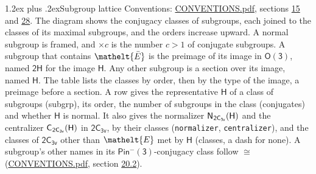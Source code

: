 \documentclass[10pt,a4paper]{article}
\makeatletter
\renewcommand\section{\@startsection{section}{1}{\z@}{-3ex plus -1ex minus -.2ex}%
  {1.2ex plus .2ex}{\normalfont\large\sffamily\bfseries\color{parttitle}}}
\numberwithin{equation}{section}
\newcommand{\eltfont}[1]{{\let\sigma\eltsigma\mathelt{#1}}}
\newcommand{\grp}[1]{\mathsf{#1}}
\newcommand{\cls}[1]{\eltfont{#1}}
\newcommand{\elt}[1]{\eltfont{#1}}
\newcommand{\samecls}{\cong}
\newcommand{\nconj}[1]{{\scriptsize$\times#1$}}
\newcommand{\barred}[1]{\bar{#1}}
\newcommand{\hairsp}{\mkern1mu}
\makeatother
\begin{document}
\section{Subgroup lattice}\label{s:subgroups}
Conventions: \href{../../CONVENTIONS.pdf}{CONVENTIONS.pdf}, sections \href{../../../rotation/CONVENTIONS.pdf\#conv.15}{15} and \href{../../CONVENTIONS.pdf\#conv.28}{28}.
The diagram shows the conjugacy classes of subgroups, each joined to the classes of its maximal subgroups, and the orders increase upward. A normal subgroup is framed, and ${\times}c$ is the number $c > 1$ of conjugate subgroups. \label{n:group.H}A subgroup that contains $\elt{\barred{E}}$ is the preimage of its image in $\grp{O(3)}$, named $\grp{2H}$ for the image $\grp{H}$. Any other subgroup is a section over its image, named $\grp{H}$. The table lists the classes by order, then by the type of the image, a preimage before a section. \label{n:head.subgroup}\label{n:head.order}\label{n:head.conjugates}\label{n:head.normal}A row gives the representative $\grp{H}$ of a class of subgroups (subgrp), its order, the number of subgroups in the class (conjugates) and whether $\grp{H}$ is normal. \label{n:group.normalizer}\label{n:group.centralizer}\label{n:head.classes}It also gives the normalizer $\grp{N}_{\hairsp \grp{2C_{3v}}}(\grp{H})$ and the centralizer $\grp{C}_{\hairsp \grp{2C_{3v}}}(\grp{H})$ in $\grp{2C_{3v}}$, by their classes (\texttt{normalizer}, \texttt{centralizer}), and the classes of $\grp{2C_{3v}}$ other than $\cls{E}$ met by $\grp{H}$ (classes, a dash for none). A subgroup's other names in its \href{Pinminus3.pdf}{$\grp{Pin^{-}(3)}$}-conjugacy class follow $\samecls$ (\href{../../CONVENTIONS.pdf}{CONVENTIONS.pdf}, section \href{../../CONVENTIONS.pdf\#conv.20.2}{20.2}).
\begin{center}
\end{center}
\end{document}
